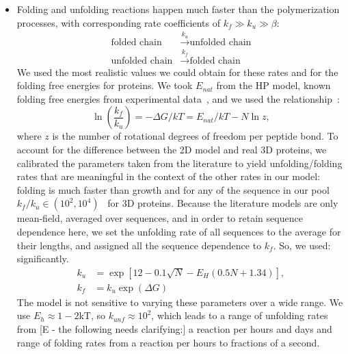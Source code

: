 \documentclass[twocolumn,letterpaper]{revtex4}
\newcommand*{\gD}{\Delta}
\newcommand*{\pt}[1]{\left( #1\right)}
\begin{document}
\begin{itemize}
\item Folding and unfolding reactions happen much faster than the polymerization processes, with 
corresponding rate coefficients of $k_f\gg k_{u}\gg\beta$:
\begin{equation}
\begin{split}
 \mbox{folded chain}&\xrightarrow{k_u}\mbox{unfolded chain}  \\
 \mbox{unfolded chain}&\xrightarrow{k_f}\mbox{folded chain}
\end{split}
\end{equation}
 We used the most realistic values we could obtain for these rates and for the folding free 
energies for proteins.  We took $E_{nat}$ from the HP model, known folding free energies from 
experimental data~\cite{Ghosh2010,Dill2011}, and we used the relationship~\cite{Ghosh2009}:
\begin{equation}
 \ln\pt{\frac{k_f}{k_u}}=-\gD G/kT = E_{nat}/kT-N\ln z,
\end{equation} 
 where $z$ is the number of rotational degrees of freedom per peptide bond.  To account for the 
difference between the 2D model and real 3D proteins, we calibrated the parameters taken from the 
literature to yield unfolding/folding rates that are meaningful in the context of the other rates 
in our model: folding is much faster than growth and for any of the sequence in our pool 
$k_f/k_u\in (10^2,10^4)$~\cite{Ghosh2010,Dill2011} for 3D proteins.  Because the literature models 
are only mean-field, averaged over sequences, and in order to retain sequence dependence here, we 
set the unfolding rate of all sequences to the average for their lengths, and assigned all the 
sequence dependence to $k_f$.  So, we used: 
significantly.
\begin{equation}
\begin{split}
  k_u &= \exp[12-0.1 \sqrt{N} -E_H(0.5 N + 1.34)],\\
  k_f &= k_u\exp(\gD G)
\end{split}
\end{equation}
The model is not sensitive to varying these parameters over a wide range.  We use $E_h \approx 
1-2$kT, so $k_{unf} \approx 10^2$, which leads to a range of unfolding rates from [E - the 
following needs clarifying:] a reaction per hours and days and range of folding rates from a 
reaction per hours to fractions of a second.


\end{itemize}
\end{document}
